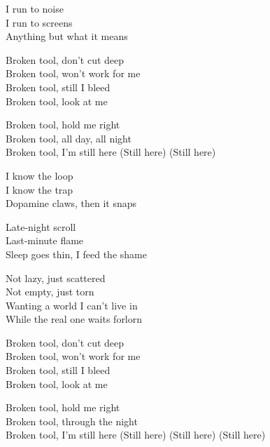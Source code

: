 \begin{lyrics}
I run to noise\\
I run to screens\\
Anything but what it means

Broken tool, don’t cut deep\\
Broken tool, won’t work for me\\
Broken tool, still I bleed\\
Broken tool, look at me

Broken tool, hold me right\\
Broken tool, all day, all night\\
Broken tool, I’m still here
(Still here)
(Still here)

I know the loop\\
I know the trap\\
Dopamine claws, then it snaps

Late-night scroll\\
Last-minute flame\\
Sleep goes thin, I feed the shame

Not lazy, just scattered\\
Not empty, just torn\\
Wanting a world I can’t live in\\
While the real one waits forlorn

Broken tool, don’t cut deep\\
Broken tool, won’t work for me\\
Broken tool, still I bleed\\
Broken tool, look at me

Broken tool, hold me right\\
Broken tool, through the night\\
Broken tool, I’m still here
(Still here)
(Still here)
(Still here)
\end{lyrics}

